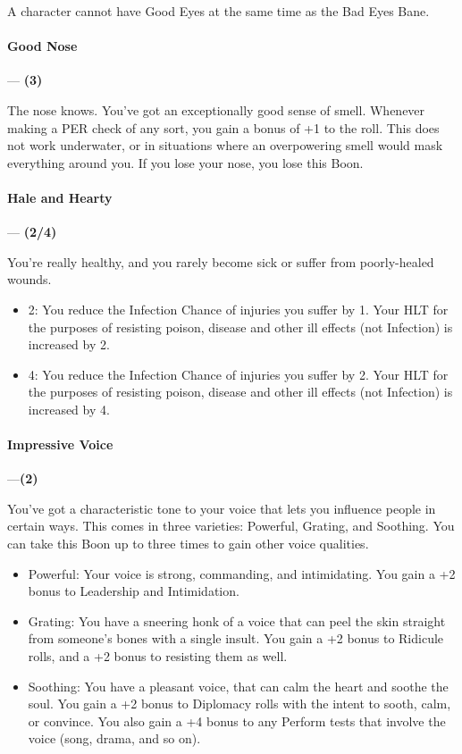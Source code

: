\documentclass[oneside,11pt,english]{book}
\begin{document}
A character cannot have Good Eyes at the same time as the Bad Eyes Bane. 


\paragraph{\label{boon:Good Nose}Good Nose}---\quad\textbf{ (3) }\par
The nose knows. You've got an exceptionally good sense of smell. Whenever making a PER check of any 
sort, you gain a bonus of +1 to the roll. This does not work underwater, or in situations where an 
overpowering smell would mask everything around you. If you lose your nose, you lose this Boon. 

 

\paragraph{\label{boon:Hale and Hearty}Hale and Hearty}---\quad\textbf{ (2/4) }\par
You're really healthy, and you rarely become sick or suffer from poorly-healed wounds. 

\begin{itemize}
\item 2: You reduce the Infection Chance of injuries you suffer by 1. Your HLT for the purposes of resisting 
poison, disease and other ill effects (not Infection) is increased by 2. 
\item 4: You reduce the Infection Chance of injuries you suffer by 2. Your HLT for the purposes of resisting 
poison, disease and other ill effects (not Infection) is increased by 4. 
\end{itemize}
\paragraph{\label{boon:Impressive Voice}Impressive Voice}---\quad\textbf{(2)}\par
You've got a characteristic tone to your voice that lets you influence people in certain ways. This comes 
in three varieties: Powerful, Grating, and Soothing. You can take this Boon up to three times to gain other 
voice qualities. 

\begin{itemize}
\item Powerful: Your voice is strong, commanding, and intimidating. You gain a +2 bonus to Leadership and 
Intimidation. 
\item Grating: You have a sneering honk of a voice that can peel the skin straight from someone's bones with a 
single insult. You gain a +2 bonus to Ridicule rolls, and a +2 bonus to resisting them as well. 
\item Soothing: You have a pleasant voice, that can calm the heart and soothe the soul. You gain a +2 bonus to 
Diplomacy rolls with the intent to sooth, calm, or convince. You also gain a +4 bonus to any Perform 
tests that involve the voice (song, drama, and so on). 
\end{itemize}
\end{document}
